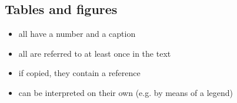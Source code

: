 \documentclass[english]{article}
\begin{document}
\subsection{Tables and figures}
\begin{itemize}
\item all have a number and a caption
\item all are referred to at least once in the text
\item if copied, they contain a reference
\item can be interpreted on their own (e.g. by means of a legend)
\end{itemize}




\end{document}

